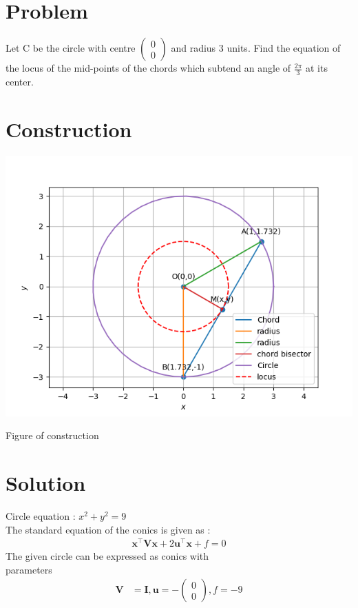 \documentclass[10pt, a4paper]{article}
\title{\mytitle}
\author{\myauthor\hspace{1em}\\\contact\\FWC22049\hspace{6.5em}IITH\hspace{0.5em}\mymodule\hspace{6em}Assignment}
\newcommand{\myvec}[1]{\ensuremath{\begin{pmatrix}#1\end{pmatrix}}}
\let\vec\mathbf
\begin{document}
	\maketitle
	\tableofcontents
   \section{Problem}
 Let C be the circle with centre $\myvec{0 \\0}$ and radius 3 units. Find the equation of the locus of the mid-points of the chords which subtend an angle of $\frac{2\pi}{3}$ at its center.
\section{Construction}
  \includegraphics[scale=0.4]{circle.png}
  	\begin{center}
  Figure of construction
  	\end{center}
  \section{Solution}
Circle equation : $x^2+y^2=9$\\
The standard equation of the conics is given as :
\begin{align}
\vec{x}^{\top}\vec{V}\vec{x}+2\vec{u}^{\top}\vec{x}+f=0
\end{align}
The given circle  can be expressed as conics with \\parameters
\begin{align}
	\vec{V} &= \vec{I}, \vec{u} = -\myvec{0 \\0}, f = -9
	\end{align}
\end{document}
